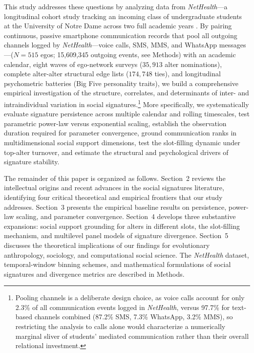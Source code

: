 \documentclass[11pt,letterpaper]{article}
\begin{document}
This study addresses these questions by analyzing data from \textit{NetHealth}---a longitudinal cohort study tracking an incoming class of undergraduate students at the University of Notre Dame across two full academic years \citep{liu2018network,purta2016experiences,faust2017exploring,liu2021heterogeneous}. By pairing continuous, passive smartphone communication records that pool all outgoing channels logged by \textit{NetHealth}---voice calls, SMS, MMS, and WhatsApp messages---($N = 515$ egos; 15,609,345 outgoing events, see Methods) with an academic calendar, eight waves of ego-network surveys ($35,913$ alter nominations), complete alter-alter structural edge lists ($174,748$ ties), and longitudinal psychometric batteries (Big Five personality traits), we build a comprehensive empirical investigation of the structure, correlates, and determinants of inter- and intraindividual variation in social signatures.\footnote{Pooling channels is a deliberate design choice, as voice calls account for only 2.3\% of all communication events logged in \textit{NetHealth}, versus 97.7\% for text-based channels combined (87.2\% SMS, 7.3\% WhatsApp, 3.2\% MMS), so restricting the analysis to calls alone would characterize a numerically marginal sliver of students' mediated communication rather than their overall relational investment.} More specifically, we systematically evaluate signature persistence across multiple calendar and rolling timescales, test parametric power-law versus exponential scaling, establish the observation duration required for parameter convergence, ground communication ranks in multidimensional social support dimensions, test the slot-filling dynamic under top-alter turnover, and estimate the structural and psychological drivers of signature stability.

The remainder of this paper is organized as follows. Section~2 reviews the intellectual origins and recent advances in the social signatures literature, identifying four critical theoretical and empirical frontiers that our study addresses. Section~3 presents the empirical baseline results on persistence, power-law scaling, and parameter convergence. Section~4 develops three substantive expansions: social support grounding for alters in different slots, the slot-filling mechanism, and multilevel panel models of signature divergence. Section~5 discusses the theoretical implications of our findings for evolutionary anthropology, sociology, and computational social science. The \textit{NetHealth} dataset, temporal-window binning schemes, and mathematical formulations of social signatures and divergence metrics are described in Methods.
\end{document}
